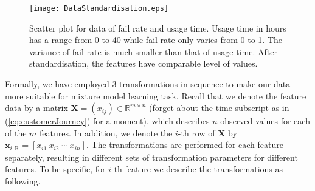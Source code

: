 \begin{figure}[!h]
\centering
\texttt{[image: DataStandardisation.eps]}
\caption{Scatter plot for data of fail rate and usage time. Usage time in hours has a range from 0 to 40 while fail rate only varies from 0 to 1. The variance of fail rate is much smaller than that of usage time. After standardisation, the features have comparable level of values.}
\label{fig:dataStandardisation}
\end{figure}

Formally, we have employed 3 transformations in sequence to make our data more suitable for mixture model learning task. Recall that we denote the feature data by a matrix $\mathbf{X} = (x_{ij}) \in \mathbb{R}^{m \times n}$ (forget about the time subscript as  in (\ref{eq:customerJourney}) for a moment), which describes $n$ observed values for each of the $m$ features. In addition, we denote the $i$-th row of $\mathbf{X}$ by $\mathbf{x}_{i,\text{R}} = [x_{i1} ~x_{i2} ~\cdots ~x_{in}]$. The transformations are performed for each feature separately, resulting in different sets of transformation parameters for different features. To be specific, for $i$-th feature we describe the transformations as following.

